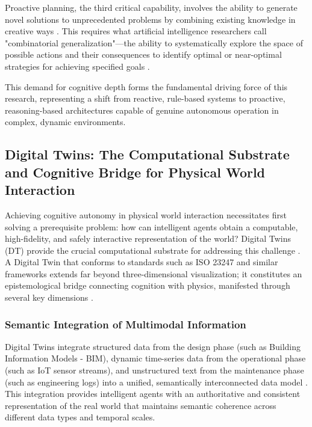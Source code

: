 Proactive planning, the third critical capability, involves the ability to generate novel solutions to unprecedented problems by combining existing knowledge in creative ways \cite{hayes1985naive, davis1990representation}. This requires what artificial intelligence researchers call "combinatorial generalization"—the ability to systematically explore the space of possible actions and their consequences to identify optimal or near-optimal strategies for achieving specified goals \cite{lake2018generalization, fodor1988connectionism}.

This demand for cognitive depth forms the fundamental driving force of this research, representing a shift from reactive, rule-based systems to proactive, reasoning-based architectures capable of genuine autonomous operation in complex, dynamic environments.

\subsection{Digital Twins: The Computational Substrate and Cognitive Bridge for Physical World Interaction}

Achieving cognitive autonomy in physical world interaction necessitates first solving a prerequisite problem: how can intelligent agents obtain a computable, high-fidelity, and safely interactive representation of the world? Digital Twins (DT) provide the crucial computational substrate for addressing this challenge \cite{grieves2014digital, tao2019digital}. A Digital Twin that conforms to standards such as ISO 23247 and similar frameworks extends far beyond three-dimensional visualization; it constitutes an epistemological bridge connecting cognition with physics, manifested through several key dimensions \cite{ISO23247, jones2020characterising}.

\subsubsection{Semantic Integration of Multimodal Information}

Digital Twins integrate structured data from the design phase (such as Building Information Models - BIM), dynamic time-series data from the operational phase (such as IoT sensor streams), and unstructured text from the maintenance phase (such as engineering logs) into a unified, semantically interconnected data model \cite{boje2020towards, lu2020digital}. This integration provides intelligent agents with an authoritative and consistent representation of the real world that maintains semantic coherence across different data types and temporal scales.

